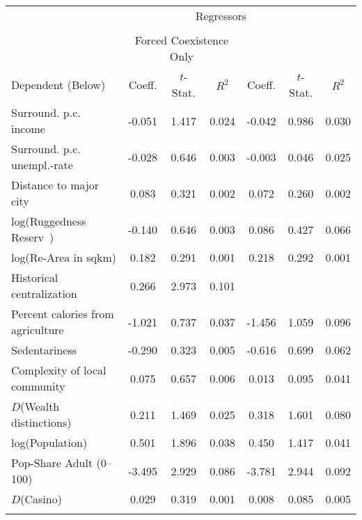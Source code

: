 \begin{center}
\begin{tabular}{lcccccc}
\hline \noalign{\smallskip} & \multicolumn{5}{c}{Regressors} & \\
 & \multicolumn{3}{c}{} & \multicolumn{3}{c}{}\\
\hline  & \multicolumn{3}{c}{Forced Coexistence Only} & \multicolumn{3}{c}{}\\
Dependent (Below) & Coeff. & $ t$-Stat. & $ R^2$ & Coeff. & $ t$-Stat. & $ R^2$\\
\noalign{\smallskip}\noalign{\smallskip}Surround. p.c. income & -0.051 & 1.417 & 0.024 & -0.042 & 0.986 & 0.030\\
Surround. p.c. unempl.-rate & -0.028 & 0.646 & 0.003 & -0.003 & 0.046 & 0.025\\
Distance to major city & 0.083 & 0.321 & 0.002 & 0.072 & 0.260 & 0.002\\
log(Ruggedness Reserv ) & -0.140 & 0.646 & 0.003 & 0.086 & 0.427 & 0.066\\
log(Re-Area in sqkm) & 0.182 & 0.291 & 0.001 & 0.218 & 0.292 & 0.001\\
Historical centralization & 0.266 & 2.973 & 0.101 &  &  & \\
Percent calories from agriculture & -1.021 & 0.737 & 0.037 & -1.456 & 1.059 & 0.096\\
Sedentariness & -0.290 & 0.323 & 0.005 & -0.616 & 0.699 & 0.062\\
Complexity of local community & 0.075 & 0.657 & 0.006 & 0.013 & 0.095 & 0.041\\
$ D$(Wealth distinctions) & 0.211 & 1.469 & 0.025 & 0.318 & 1.601 & 0.080\\
log(Population) & 0.501 & 1.896 & 0.038 & 0.450 & 1.417 & 0.041\\
Pop-Share Adult (0–100) & -3.495 & 2.929 & 0.086 & -3.781 & 2.944 & 0.092\\
$ D$(Casino) & 0.029 & 0.319 & 0.001 & 0.008 & 0.085 & 0.005\\
\noalign{\smallskip}\hline\end{tabular}\\
\end{center}
